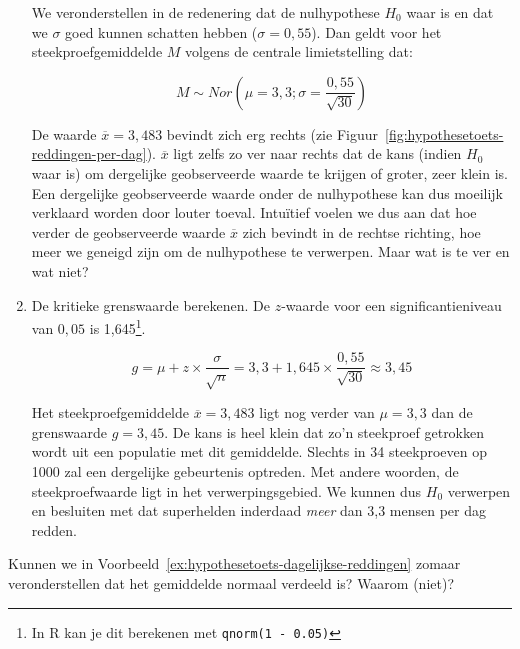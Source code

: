 \begin{example}
\begin{enumerate}
    We veronderstellen in de redenering dat de nulhypothese $H_{0}$ waar is en dat we $\sigma$ goed kunnen schatten hebben ($\sigma = 0,55$). Dan geldt voor het steekproefgemiddelde $M$ volgens de centrale limietstelling dat:
    
    \[M \sim  Nor(\mu = 3,3; \sigma = \frac{0,55}{\sqrt{30}})\]
    
    De waarde $\overline{x} = 3,483$ bevindt zich erg rechts (zie Figuur~\ref{fig:hypothesetoets-reddingen-per-dag}). $\overline{x}$ ligt zelfs zo ver naar rechts dat de kans (indien $H_{0}$ waar is) om dergelijke geobserveerde waarde te krijgen of groter, zeer klein is. Een dergelijke geobserveerde waarde onder de nulhypothese kan dus moeilijk verklaard worden door louter toeval. Intu\"itief voelen we dus aan dat hoe verder de geobserveerde waarde $\overline{x}$ zich bevindt in de rechtse richting, hoe meer we geneigd zijn om de nulhypothese te verwerpen. Maar wat is te ver en wat niet?
    
    \item De kritieke grenswaarde berekenen. De $z$-waarde voor een significantieniveau van $0,05$ is 1,645\footnote{In R kan je dit berekenen met \texttt{qnorm(1 - 0.05)}}.
    
    \[ g = \mu + z \times \frac{\sigma}{\sqrt{n}} = 3,3 + 1,645 \times \frac{0,55}{\sqrt{30}} \approx 3,45 \]
    
    Het steekproefgemiddelde $\overline{x} = 3,483$ ligt nog verder van $\mu = 3,3$ dan de grenswaarde $g = 3,45$. De kans is heel klein dat zo'n steekproef getrokken wordt uit een populatie met dit gemiddelde. Slechts in 34 steekproeven op 1000 zal een dergelijke gebeurtenis optreden. Met andere woorden, de steekproefwaarde ligt in het verwerpingsgebied. We kunnen dus $H_0$ verwerpen en besluiten met dat superhelden inderdaad \emph{meer} dan 3,3 mensen per dag redden.
  \end{enumerate}

\end{example}

\begin{exercise}
  Kunnen we in Voorbeeld~\ref{ex:hypothesetoets-dagelijkse-reddingen} zomaar veronderstellen dat het gemiddelde normaal verdeeld is? Waarom (niet)?
\end{exercise}

